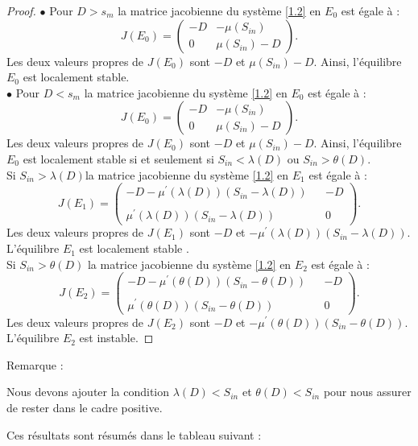\documentclass[12pt,a4paper]{report}%
\newcounter{remm}[chapter]
\newenvironment{remarque}[2][]
  {\refstepcounter{remm}
  \begin{bclogo}[
    couleur=white,
    arrondi=0.1,
    couleurBord=white,#1]{Remarque \theremm:#2}
  }
  {\end{bclogo}}
\begin{document}
\begin{proof}
$\bullet$ Pour $D >s_m$ la matrice jacobienne du système \eqref{1.2} en $E_0$ est égale à :
\[
J(E_0)=\begin{pmatrix}
-D & -\mu(S_{in}) \\
0 & \mu(S_{in})-D
\end{pmatrix}.
\]
Les deux valeurs propres de $J(E_0)$ sont $- D$ et $\mu(S_{in})- D$. Ainsi, l'équilibre $E_0$ est localement stable.\\
$\bullet$ Pour $D<s_m$ la matrice jacobienne du système \eqref{1.2} en $E_0$ est égale à :
\[
J(E_0)=\begin{pmatrix}
-D & -\mu(S_{in}) \\
0 & \mu(S_{in})-D
\end{pmatrix}.
\]
Les deux valeurs propres de $J(E_0)$ sont $- D$ et $\mu(S_{in})- D$. Ainsi, l'équilibre $E_0$ est localement stable si et seulement si $S_{in}<\lambda(D)$ ou $S_{in}>\theta(D)$.\\
Si $S_{in}>\lambda(D)$la matrice jacobienne du système \eqref{1.2} en $E_1$ est égale à :
\[
J(E_1)=\begin{pmatrix}
-D-\mu^{\prime}(\lambda(D))(S_{in}-\lambda(D))& & -D \\
& \\
\mu^{\prime}(\lambda(D))(S_{in}-\lambda(D))& & 0
\end{pmatrix}.
\]
Les deux valeurs propres de $J(E_1)$ sont $- D$ et $-\mu^{\prime}(\lambda(D))(S_{in}-\lambda(D))$. L'équilibre $E_1$ est localement stable .\\
Si $S_{in}>\theta(D)$ la matrice jacobienne du système \eqref{1.2} en $E_2$ est égale à :
\[
J(E_2)=\begin{pmatrix}
-D-\mu^{\prime}(\theta(D))(S_{in}-\theta(D))& & -D \\
& \\
\mu^{\prime}(\theta(D))(S_{in}-\theta(D))& & 0
\end{pmatrix}.
\]
Les deux valeurs propres de $J(E_2)$ sont $- D$ et $-\mu^{\prime}(\theta(D))(S_{in}-\theta(D))$. L'équilibre $E_2$ est instable.
\end{proof}
\begin{remarque}{}
 Nous devons ajouter la condition $\lambda(D)< S_{in}$ et $\theta(D)<S_{in}$  pour nous assurer de rester dans le cadre positive.
\end{remarque}
Ces résultats sont résumés dans le tableau suivant :
\end{document}
